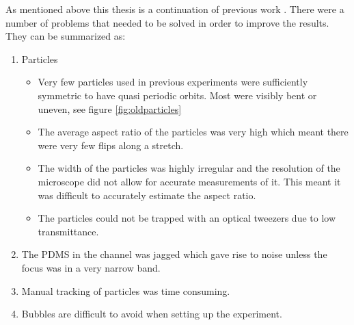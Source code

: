 As mentioned above this thesis is a continuation of previous work \cite{AntonThesis, JonasExperiment, Mishra}. There were a number of problems that needed to be solved in order to improve the results. They can be summarized as:
\begin{enumerate} \label{list:problems}
	\item Particles 
	\begin{itemize}
		\item Very few particles used in previous experiments were sufficiently symmetric to have quasi periodic orbits. Most were visibly bent or uneven, see figure \ref{fig:oldparticles}
		\item The average aspect ratio of the particles was very high which meant there were very few flips along a stretch.
		\item The width of the particles was highly irregular and the resolution of the microscope did not allow for accurate measurements of it. This meant it was difficult to accurately estimate the aspect ratio.
		\item The particles could not be trapped with an optical tweezers due to low transmittance.
	\end{itemize}
	\item The PDMS in the channel was jagged which gave rise to noise unless the focus was in a very narrow band.
	\item Manual tracking of particles was time consuming.
	\item Bubbles are difficult to avoid when setting up the experiment.
\end{enumerate}

